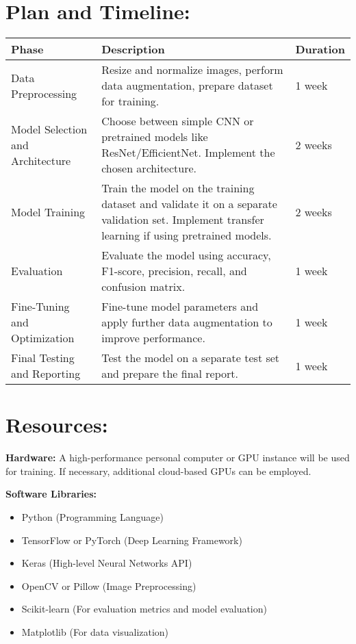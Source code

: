 \documentclass[12pt]{article}
\begin{document}
\section*{Plan and Timeline:}
\begin{tabular}{|l|l|l|}
\hline
\textbf{Phase} & \textbf{Description} & \textbf{Duration} \\
\hline
Data Preprocessing & Resize and normalize images, perform data augmentation, prepare dataset for training. & 1 week \\
\hline
Model Selection and Architecture & Choose between simple CNN or pretrained models like ResNet/EfficientNet. Implement the chosen architecture. & 2 weeks \\
\hline
Model Training & Train the model on the training dataset and validate it on a separate validation set. Implement transfer learning if using pretrained models. & 2 weeks \\
\hline
Evaluation & Evaluate the model using accuracy, F1-score, precision, recall, and confusion matrix. & 1 week \\
\hline
Fine-Tuning and Optimization & Fine-tune model parameters and apply further data augmentation to improve performance. & 1 week \\
\hline
Final Testing and Reporting & Test the model on a separate test set and prepare the final report. & 1 week \\
\hline
\end{tabular}

\section*{Resources:}
\textbf{Hardware:} A high-performance personal computer or GPU instance will be used for training. If necessary, additional cloud-based GPUs can be employed.

\textbf{Software Libraries:}
\begin{itemize}
    \item Python (Programming Language)
    \item TensorFlow or PyTorch (Deep Learning Framework)
    \item Keras (High-level Neural Networks API)
    \item OpenCV or Pillow (Image Preprocessing)
    \item Scikit-learn (For evaluation metrics and model evaluation)
    \item Matplotlib (For data visualization)
\end{itemize}
\end{document}
